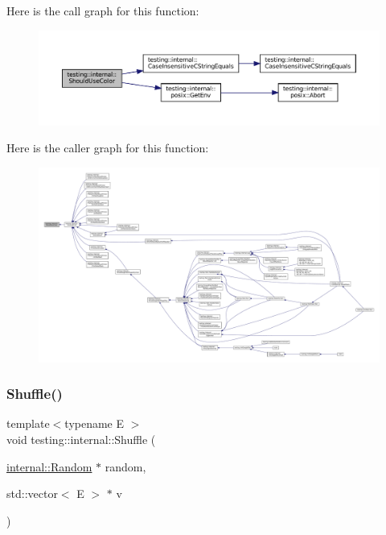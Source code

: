 Here is the call graph for this function\+:
\nopagebreak
\begin{figure}[H]
\begin{center}
\leavevmode
\includegraphics[width=350pt]{namespacetesting_1_1internal_ac1db1b4603967a6c4404f31cbbac31a6_cgraph}
\end{center}
\end{figure}
Here is the caller graph for this function\+:
\nopagebreak
\begin{figure}[H]
\begin{center}
\leavevmode
\includegraphics[width=350pt]{namespacetesting_1_1internal_ac1db1b4603967a6c4404f31cbbac31a6_icgraph}
\end{center}
\end{figure}
\mbox{\label{namespacetesting_1_1internal_a90d9e6ffe8522a7eb1b2ce9b1a0c4673}} 
\subsubsection{\texorpdfstring{Shuffle()}{Shuffle()}}
{\footnotesize\ttfamily template$<$typename E $>$ \\
void testing\+::internal\+::\+Shuffle (\begin{DoxyParamCaption}\item[{\hyperlink{classtesting_1_1internal_1_1Random}{internal\+::\+Random} $\ast$}]{random,  }\item[{std\+::vector$<$ E $>$ $\ast$}]{v }\end{DoxyParamCaption})\hspace{0.3cm}{\ttfamily [inline]}}



